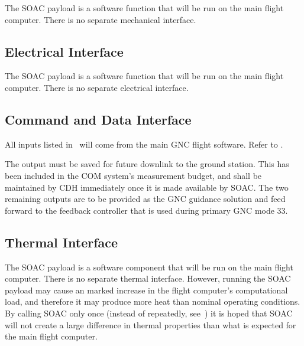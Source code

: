 \documentclass[10pt]{article}
\begin{document}
The SOAC payload is a software function that will be run on the main flight computer. There is no separate mechanical interface.

\subsection{Electrical Interface}\label{sec2:elec_interface}

The SOAC payload is a software function that will be run on the main flight computer. There is no separate electrical interface. 

\subsection{Command and Data Interface}\label{sec2:cmd_interface}

All inputs listed in~ will come from the main GNC flight software. Refer to . 

The output  must be saved for future downlink to the ground station. This has been included in the COM system's measurement budget, and shall be maintained by CDH immediately once it is made available by SOAC. The two remaining outputs are to be provided as the GNC guidance solution and feed forward to the feedback controller that is used during primary GNC mode $33$. 

\subsection{Thermal Interface}\label{sec2:thermal_interface}

The SOAC payload is a software component that will be run on the main flight computer. There is no separate thermal interface. However, running the SOAC payload may cause an marked increase in the flight computer's computational load, and therefore it may produce more heat than nominal operating conditions. By calling SOAC only once (instead of repeatedly, see~) it is hoped that SOAC will not create a large difference in thermal properties than what is expected for the main flight computer.

\end{document}
